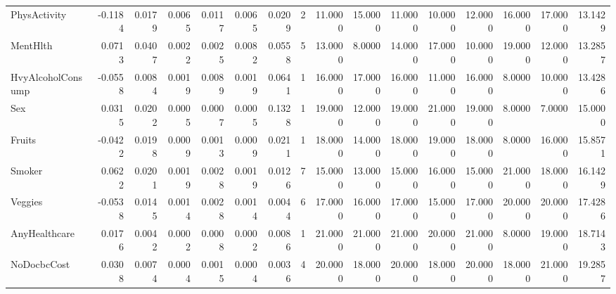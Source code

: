 \begin{tabular}{lrrrrrrrrrrrrrrr}
PhysActivity & -0.1184 & 0.0179 & 0.0065 & 0.0117 & 0.0065 & 0.0209 & 2 & 11.0000 & 15.0000 & 11.0000 & 10.0000 & 12.0000 & 16.0000 & 17.0000 & 13.1429 \\
MentHlth & 0.0713 & 0.0407 & 0.0022 & 0.0025 & 0.0082 & 0.0558 & 5 & 13.0000 & 8.0000 & 14.0000 & 17.0000 & 10.0000 & 19.0000 & 12.0000 & 13.2857 \\
HvyAlcoholConsump & -0.0558 & 0.0084 & 0.0019 & 0.0089 & 0.0019 & 0.0641 & 1 & 16.0000 & 17.0000 & 16.0000 & 11.0000 & 16.0000 & 8.0000 & 10.0000 & 13.4286 \\
Sex & 0.0315 & 0.0202 & 0.0005 & 0.0007 & 0.0005 & 0.1328 & 1 & 19.0000 & 12.0000 & 19.0000 & 21.0000 & 19.0000 & 8.0000 & 7.0000 & 15.0000 \\
Fruits & -0.0422 & 0.0198 & 0.0009 & 0.0013 & 0.0009 & 0.0211 & 1 & 18.0000 & 14.0000 & 18.0000 & 19.0000 & 18.0000 & 8.0000 & 16.0000 & 15.8571 \\
Smoker & 0.0622 & 0.0201 & 0.0019 & 0.0028 & 0.0019 & 0.0126 & 7 & 15.0000 & 13.0000 & 15.0000 & 16.0000 & 15.0000 & 21.0000 & 18.0000 & 16.1429 \\
Veggies & -0.0538 & 0.0145 & 0.0014 & 0.0028 & 0.0014 & 0.0044 & 6 & 17.0000 & 16.0000 & 17.0000 & 15.0000 & 17.0000 & 20.0000 & 20.0000 & 17.4286 \\
AnyHealthcare & 0.0176 & 0.0042 & 0.0002 & 0.0008 & 0.0002 & 0.0086 & 1 & 21.0000 & 21.0000 & 21.0000 & 20.0000 & 21.0000 & 8.0000 & 19.0000 & 18.7143 \\
NoDocbcCost & 0.0308 & 0.0074 & 0.0004 & 0.0015 & 0.0004 & 0.0036 & 4 & 20.0000 & 18.0000 & 20.0000 & 18.0000 & 20.0000 & 18.0000 & 21.0000 & 19.2857 \\
\bottomrule
\end{tabular}
